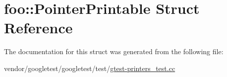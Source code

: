 \hypertarget{structfoo_1_1_pointer_printable}{}\section{foo\+:\+:Pointer\+Printable Struct Reference}
\label{structfoo_1_1_pointer_printable}


The documentation for this struct was generated from the following file\+:\begin{DoxyCompactItemize}
\item 
vendor/googletest/googletest/test/\hyperlink{gtest-printers__test_8cc}{gtest-\/printers\+\_\+test.\+cc}\end{DoxyCompactItemize}
